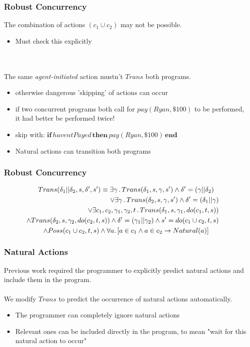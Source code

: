 \documentclass[compress]{beamer}
\begin{document}
\begin{frame}
\frametitle{Robust Concurrency}
The combination of actions $(c_1\cup c_2)$ may not be possible.
\begin{itemize}
  \item Must check this explicitly
\end{itemize}
\ \\
\ \\
The same \emph{agent-initiated} action mustn't $Trans$ both programs.
\begin{itemize}
  \item otherwise dangerous 'skipping' of actions can occur
  \item if two concurrent programs both call for $pay(Ryan,\$100)$ to be performed, it had better be performed twice!
  \item skip with: $\mathbf{if}\,haventPayed\,\mathbf{then}\,pay(Ryan,\$100)\,\mathbf{end}$
  \item Natural actions can transition both programs
\end{itemize}
\end{frame}

\begin{frame}
\frametitle{Robust Concurrency}
\begin{multline*}
Trans(\delta_{1}||\delta_{2},s,\delta',s')\equiv\exists\gamma\,.\, Trans(\delta_{1},s,\gamma,s')\wedge\delta'=(\gamma||\delta_{2})\\
\shoveright{\vee\exists\gamma\,.\, Trans(\delta_{2},s,\gamma,s')\wedge\delta'=(\delta_{1}||\gamma)}\\
\shoveright{\vee\exists c_{1},c_{2},\gamma_{1},\gamma_{2},t\,.\, Trans(\delta_{1},s,\gamma_{1},do(c_{1},t,s))}\\
\shoveright{\wedge Trans(\delta_{2},s,\gamma_{2},do(c_{2},t,s))\wedge\delta'=(\gamma_1||\gamma_2)\wedge s'=do(c_1\cup c_2,t,s)}\\
\wedge Poss(c_1\cup c_2,t,s)\wedge\forall a.\left[a\in c_{1}\wedge a\in c_{2}\rightarrow Natural(a)\right]
\end{multline*}
\end{frame}

\begin{frame}
\frametitle{Natural Actions}
Previous work required the programmer to explicitly predict natural actions
and include them in the program.
\ \\
\ \\
We modify $Trans$ to predict the occurrence of natural actions automatically.
\begin{itemize}
  \item The programmer can completely ignore natural actions
  \item Relevant ones can be included directly in the program, to mean "wait for this natural action to occur"
\end{itemize}
\end{frame}
\end{document}
